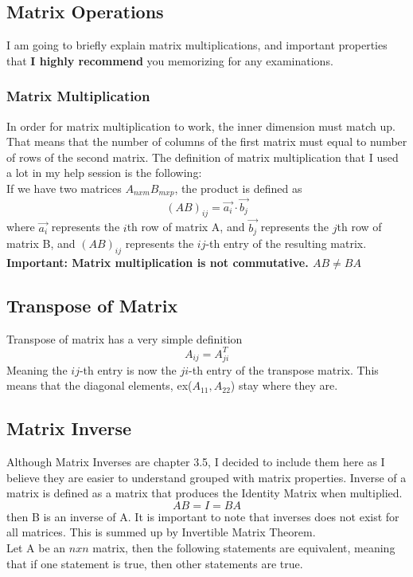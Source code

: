 \documentclass[12pt]{article}
\begin{document}
\subsection{Matrix Operations}
I am going to briefly explain matrix multiplications, and important properties that \textbf{I highly recommend} you memorizing for any examinations. 
\subsubsection{Matrix Multiplication}
In order for matrix multiplication to work, the inner dimension must match up. That means that the number of columns of the first matrix must equal to number of rows of the second matrix. 
The definition of matrix multiplication that I used a lot in my help session is the following:\\
If we have two matrices $A_{nxm}B_{mxp}$, the product is defined as
\begin{equation}
(AB)_{ij}  = \vec{a_i} \cdot \vec{b_j} 
\end{equation}
where $\vec{a_i}$ represents the $i$th row of matrix A, and $\vec{b_j}$ represents the $j$th row of matrix B, and $(AB)_{ij}$ represents the $ij$-th entry of the resulting matrix. \\
\textbf{Important: Matrix multiplication is not commutative. $AB \neq BA$}

\subsection{Transpose of Matrix}
Transpose of matrix has a very simple definition
\begin{equation}
A_{ij} = A^{T}_{ji}
\end{equation}
Meaning the $ij$-th entry is now the $ji$-th entry of the transpose matrix. This means that the diagonal elements, ex($A_{11}, A_{22}$) stay where they are.

\subsection{Matrix Inverse}
Although Matrix Inverses are chapter 3.5, I decided to include them here as I believe they are easier to understand grouped with matrix properties. Inverse of a matrix is defined as a matrix that produces the Identity Matrix when multiplied. 
\begin{equation}
AB = I = BA
\end{equation}
then B is an inverse of A.
It is important to note that inverses does not exist for all matrices. This is summed up by Invertible Matrix Theorem.\\
Let A be an $nxn$ matrix, then the following statements are equivalent, meaning that if one statement is true, then other statements are true.
\end{document}

